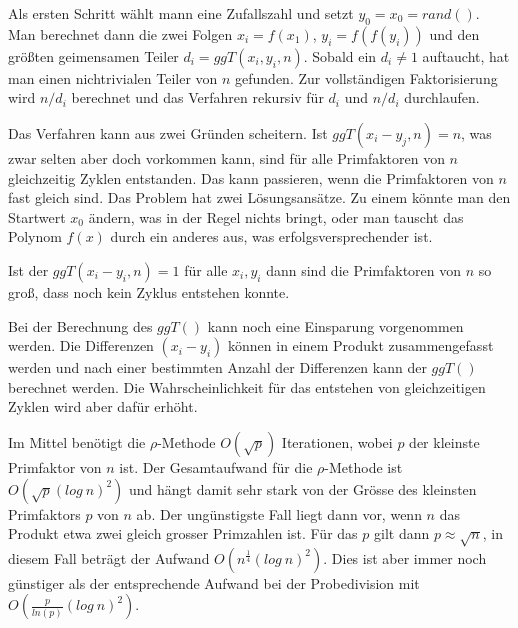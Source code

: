 \documentclass[a4paper,11pt]{article}
\begin{document}
Als ersten Schritt wählt mann eine Zufallszahl und setzt $y_0 = x_0 = rand()$.
Man berechnet dann die zwei Folgen $x_i = f(x_1)$,
$y_i = f(f(y_i))$ und den größten geimensamen Teiler  $d_i = ggT(x_i, y_i, n)$.
Sobald ein $d_i \neq 1$ auftaucht, hat man einen nichtrivialen Teiler von $n$
gefunden. Zur vollständigen Faktorisierung wird $n/d_i$ berechnet und das
Verfahren rekursiv für $d_i$ und $n/d_i$ durchlaufen.

Das Verfahren kann aus zwei Gründen scheitern. Ist $ggT(x_i-y_j, n) = n$, was
zwar selten aber doch vorkommen kann, sind für alle Primfaktoren von $n$
gleichzeitig Zyklen entstanden. Das kann passieren, wenn die Primfaktoren
von $n$ fast gleich sind. Das Problem hat zwei Lösungsansätze. Zu einem
könnte man den Startwert $x_0$ ändern, was in der Regel nichts bringt, oder
man tauscht das Polynom $f(x)$ durch ein anderes aus, was erfolgsversprechender
ist.

Ist der $ggT(x_i - y_i , n) = 1$ für alle $x_i, y_i$ dann sind die Primfaktoren
von $n$ so groß, dass noch kein Zyklus entstehen konnte.

Bei der Berechnung des $ggT()$ kann noch eine Einsparung vorgenommen werden.
Die Differenzen $(x_i - y_i)$ können in einem Produkt zusammengefasst werden
und nach einer bestimmten Anzahl der Differenzen kann der $ggT()$ berechnet
werden. Die Wahrscheinlichkeit für das entstehen von gleichzeitigen Zyklen
wird aber dafür erhöht.

Im Mittel benötigt die $\rho$-Methode $O(\sqrt{p})$ Iterationen, wobei $p$
der kleinste Primfaktor von $n$ ist. Der Gesamtaufwand für die
$\rho$-Methode ist $O(\sqrt{p}(log\ n)^2)$ und hängt damit sehr stark von
der Grösse des kleinsten Primfaktors $p$ von $n$ ab. Der ungünstigste Fall
liegt dann vor, wenn $n$ das Produkt etwa zwei gleich grosser
Primzahlen ist. Für das $p$ gilt dann $p\approx\sqrt{n}$, in diesem Fall beträgt
der Aufwand $O(n^{\frac{1}{4}}(log\ n)^2)$. Dies ist aber immer noch günstiger
als der entsprechende Aufwand bei der Probedivision mit
$O(\frac{p}{ln(p)}(log\ n)^2)$.
\end{document}
